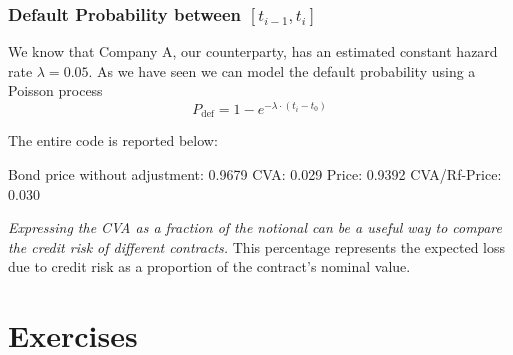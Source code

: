 \subsubsection{Default Probability between $[t_{i-1}, t_i]$}

We know that Company A, our counterparty, has an estimated constant hazard rate $\lambda = 0.05$. As we have seen we can model the default probability using a Poisson process
$$
P_{\text{def}} = 1 - e^{-\lambda \cdot (t_i-t_0)}
$$

The entire code is reported below:


\begin{ioutput}
Bond price without adjustment: 0.9679
CVA: 0.029
Price: 0.9392
CVA/Rf-Price: 0.030
\end{ioutput}

\emph{Expressing the CVA as a fraction of the notional can be a useful way to compare the credit risk of different contracts.}
This percentage represents the expected loss due to credit risk as a proportion of the contract's nominal value.


\section*{Exercises}

